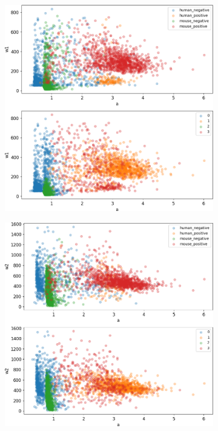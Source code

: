 \begin{figure}
	\begin{subfigure}{0.49\textwidth}
		\includegraphics[width=\textwidth]{fig/seperate_a_w1}
	\end{subfigure}
	\hfill
	\begin{subfigure}{0.49\textwidth}
		\includegraphics[width=\textwidth]{fig/seperate_a_w2}

\end{subfigure}
\end{figure}
